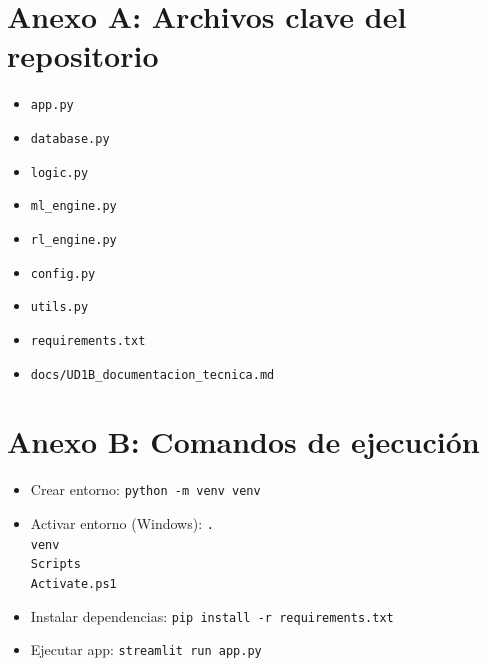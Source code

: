 \documentclass[12pt,a4paper]{article}
\begin{document}
\section*{Anexo A: Archivos clave del repositorio}
\begin{itemize}
    \item \texttt{app.py}
    \item \texttt{database.py}
    \item \texttt{logic.py}
    \item \texttt{ml\_engine.py}
    \item \texttt{rl\_engine.py}
    \item \texttt{config.py}
    \item \texttt{utils.py}
    \item \texttt{requirements.txt}
    \item \texttt{docs/UD1B\_documentacion\_tecnica.md}
\end{itemize}

\section*{Anexo B: Comandos de ejecuci\'on}
\begin{itemize}
    \item Crear entorno: \texttt{python -m venv venv}
    \item Activar entorno (Windows): \texttt{.\\venv\\Scripts\\Activate.ps1}
    \item Instalar dependencias: \texttt{pip install -r requirements.txt}
    \item Ejecutar app: \texttt{streamlit run app.py}
\end{itemize}
\end{document}
